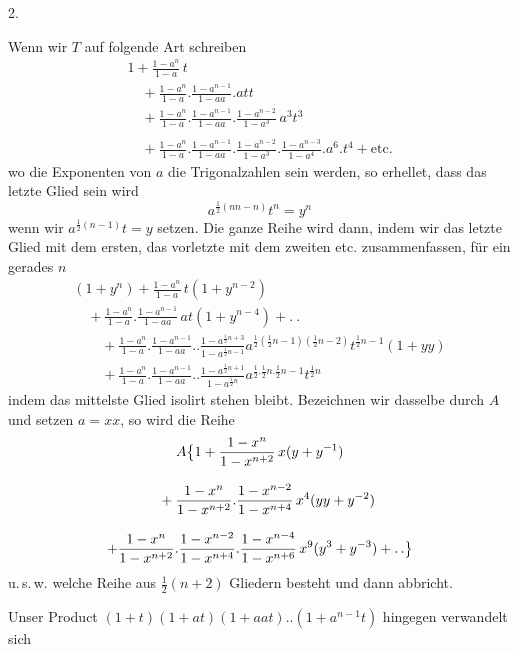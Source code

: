 \par\medskip{}\centerline{2.}\nobreak\smallskip
Wenn wir $T$ auf folgende Art schreiben
\[
\begin{gathered}
1+\frac{1-a^n}{1-a}\,t
 \\[8pt]\quad{}+\frac{1-a^n}{1-a}.\frac{1-a^{n-1}}{1-aa}.att
 \\[8pt]\quad{}+\frac{1-a^n}{1-a}.\frac{1-a^{n-1}}{1-aa}.
  \frac{1-a^{n-2}}{1-a^3}\,a^3t^3
\\[8pt]
\qquad\\[8pt]\quad{}+\frac{1-a^n}{1-a}.\frac{1-a^{n-1}}{1-aa}.
  \frac{1-a^{n-2}}{1-a^3}.\frac{1-a^{n-3}}{1-a^4}.a^6.t^4
 +\text{etc.}
\end{gathered}
\]
wo die Exponenten von $a$ die Trigonalzahlen sein werden, so erhellet,
dass das letzte Glied sein wird
\[
a^{\frac12(nn-n)}t^n=y^n
\]
wenn wir $a^{\frac12(n-1)}t=y$ setzen. Die ganze Reihe wird dann,
indem wir das letzte Glied mit dem ersten, das vorletzte mit dem zweiten
etc. zusammenfassen, für ein gerades $n$
\[
\begin{gathered}
(1+y^n)+\frac{1-a^n}{1-a}\,t(1+y^{n-2})
 \\[8pt]\quad{}+\frac{1-a^n}{1-a}.\frac{1-a^{n-1}}{1-aa}\,at(1+y^{n-4})+.\ .
\\[8pt]
\qquad+\frac{1-a^n}{1-a}.\frac{1-a^{n-1}}{1-aa}..\frac{1-a^{\frac12n+3}}{1-a^{\frac12n-1}}
 a^{\frac12(\frac12n-1)(\frac12n-2)}t^{\frac12n-1}(1+yy)
\\[8pt]
\qquad+\frac{1-a^n}{1-a}.\frac{1-a^{n-1}}{1-aa}..\frac{1-a^{\frac12n+1}}{1-a^{\frac12n}}
 a^{\frac12.\frac12n.\frac12n-1}t^{\frac12n}
\end{gathered}
\]
indem das mittelste Glied isolirt stehen bleibt. Bezeichnen wir dasselbe
durch $A$ und setzen $a=xx$, so wird die Reihe
\[
\begin{gathered}
A\bigl\{1+\frac{1-x^n}{1-x^{n+2}}\,x(y+y^{-1})
 \\[8pt]\quad{}+\frac{1-x^n}{1-x^{n+2}}.\frac{1-x^{n-2}}{1-x^{n+4}}\,x^4(yy+y^{-2})
\\[8pt]
+\frac{1-x^n}{1-x^{n+2}}.\frac{1-x^{n-2}}{1-x^{n+4}}.
 \frac{1-x^{n-4}}{1-x^{n+6}}\,x^9(y^3+y^{-3})+\mathinner{.\,.}\bigr\}
\end{gathered}
\]
u.\,s.\,w. welche Reihe aus $\frac12(n+2)$ Gliedern besteht und dann abbricht.

Unser Product $(1+t)(1+at)(1+aat)..(1+a^{n-1}t)$ hingegen verwandelt sich

